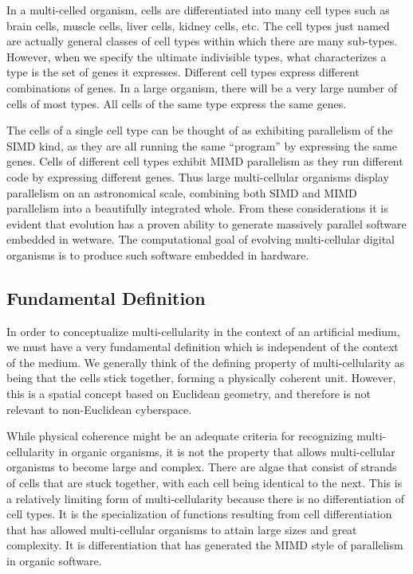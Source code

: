 In a multi-celled organism, cells are differentiated into many cell
types such as brain cells, muscle cells, liver cells, kidney cells,
etc.  The cell types just named are actually general classes of cell
types within which there are many sub-types.  However, when we specify
the ultimate indivisible types, what characterizes a type is the set
of genes it expresses.  Different cell types express different combinations
of genes.  In a large organism, there will be a very large number of
cells of most types.  All cells of the same type express the same genes.

The cells of a single cell type can be thought of as exhibiting
parallelism of the SIMD kind, as they are all running the same ``program''
by expressing the same genes.  Cells of different cell types exhibit
MIMD parallelism as they run different code by expressing different
genes.  Thus large multi-cellular organisms display parallelism on an
astronomical scale, combining both SIMD and MIMD parallelism into a
beautifully integrated whole.  From these considerations it is evident
that evolution has a proven ability to generate massively parallel
software embedded in wetware.  The computational goal of evolving
multi-cellular digital organisms is to produce such software embedded
in hardware.

\subsection{Fundamental Definition}

In order to conceptualize multi-cellularity in the context of an
artificial medium, we must have a very fundamental definition which
is independent of the context of the medium.  We generally think
of the defining property of multi-cellularity as being that the
cells stick together, forming a physically coherent unit.  However,
this is a spatial concept based on Euclidean geometry, and therefore
is not relevant to non-Euclidean cyberspace.

While physical coherence might be an adequate criteria for recognizing
multi-cellularity in organic organisms, it is not the property that
allows multi-cellular organisms to become large and complex.  There are
algae that consist of strands of cells that are stuck together, with each
cell being identical to the next.  This is a relatively limiting form
of multi-cellularity because there is no differentiation of cell types.
It is the specialization of functions resulting from cell differentiation
that has allowed multi-cellular organisms to attain large sizes and great
complexity.  It is differentiation that has generated the MIMD style
of parallelism in organic software.

